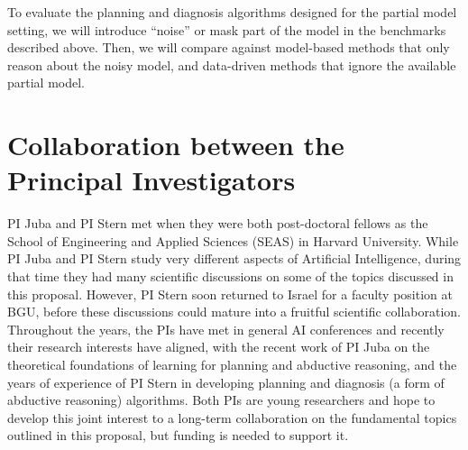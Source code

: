 \documentclass[12pt]{article}
\newcommand{\note}[1]{\textbf{\textit{#1}}}
\begin{document}
To evaluate the planning and diagnosis algorithms designed for the partial model setting, we will introduce ``noise'' or mask part of the model in the benchmarks described above. Then, we will compare against model-based methods that only reason about the noisy model, and data-driven methods that ignore the available partial model. %


\vspace{-0.35cm}
\section{Collaboration between the Principal Investigators}
PI Juba and PI Stern met when they were both post-doctoral fellows as the School of Engineering and Applied Sciences (SEAS) in Harvard University. 
While PI Juba and PI Stern study very different aspects of Artificial Intelligence, during that time they had many scientific discussions on some of the topics discussed in this proposal. However, PI Stern soon returned to Israel for a faculty position at BGU, before these discussions could mature into a fruitful scientific collaboration. 
Throughout the years, the PIs have met in general AI conferences
and recently their research interests have aligned, 
with the recent work of PI Juba on the theoretical foundations of learning for planning and abductive reasoning, and the years of experience of PI Stern in developing planning and diagnosis (a form of abductive reasoning) algorithms. 
Both PIs are young researchers and hope to develop this joint interest to a long-term collaboration on the fundamental topics outlined in this proposal, but funding is needed to support it.  

\vspace{-0.35cm}
\end{document}
